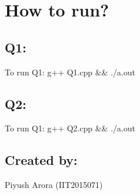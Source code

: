 \hypertarget{index_intro_sec}{}\section{How to run?}\label{index_intro_sec}
\hypertarget{index_q1}{}\subsection{Q1\+:}\label{index_q1}
To run Q1\+: g++ Q1.\+cpp \&\& ./a.out \hypertarget{index_q2}{}\subsection{Q2\+:}\label{index_q2}
To run Q1\+: g++ Q2.\+cpp \&\& ./a.out\hypertarget{index_creator}{}\subsection{Created by\+:}\label{index_creator}
Piyush Arora (I\+I\+T2015071) 